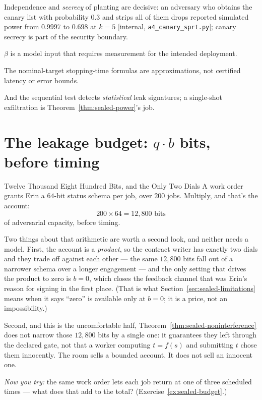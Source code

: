 \documentclass[11pt,a4paper]{article}
\theoremstyle{definition}
\begin{document}
\begin{pdboundary}
\setlength{\parskip}{4pt plus 1pt}
Independence and \emph{secrecy} of planting are decisive: an adversary who
obtains the canary list with probability $0.3$ and strips all of them drops
reported simulated power from $0.9997$ to $0.698$ at $k=5$ [internal,
\texttt{a4\_canary\_sprt.py}]; canary secrecy is part of the security
boundary.

$\beta$ is a model input that requires measurement for the intended
deployment.

The nominal-target stopping-time formulas are approximations,
not certified latency or error bounds.

And
the sequential test detects \emph{statistical} leak signatures; a single-shot
exfiltration is Theorem~\ref{thm:sealed-power}'s job.
\end{pdboundary}

\section{The leakage budget: $q\cdot b$ bits, before timing}\label{sec:sealed-budget}

\begin{pdexample}{Twelve Thousand Eight Hundred Bits, and the Only Two Dials}
\setlength{\parskip}{4pt plus 1pt}
A work order grants Erin a $64$-bit status schema per job, over $200$ jobs.
Multiply, and that's the account:
\[
200\times 64=12{,}800\text{ bits}
\]
of adversarial capacity, before timing.

Two things about that arithmetic are worth a second
look, and neither needs a model. First, the account is a \emph{product}, so
the contract writer has exactly two dials and they trade off against each
other --- the same $12{,}800$ bits fall out of a narrower schema over a longer
engagement --- and the only setting that drives the product to zero is $b=0$,
which closes the feedback channel that was Erin's reason for signing in the
first place. (That is what Section~\ref{sec:sealed-limitations} means when it
says ``zero'' is available only at $b=0$; it is a price, not an impossibility.)

Second, and this is the uncomfortable half,
Theorem~\ref{thm:sealed-noninterference} does not narrow those $12{,}800$ bits
by a single one: it guarantees they left through the declared gate, not that a
worker computing $t=f(s)$ and submitting $t$ chose them innocently. The room
sells a bounded account. It does not sell an innocent one.

\emph{Now you try:}
the same work order lets each job return at one of three scheduled times ---
what does that add to the total? (Exercise~\ref{ex:sealed-budget}.)
\end{pdexample}
\end{document}
